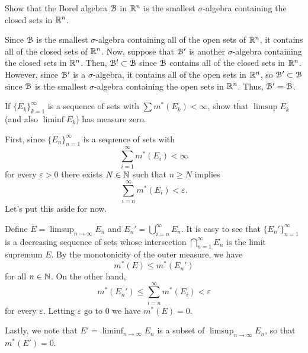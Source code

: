 \begin{problem}
  Show that the Borel algebra $\mathcal{B}$ in $\mathbb{R}^n$ is the smallest
  $\sigma$-algebra containing the closed sets in $\mathbb{R}^n$.
\end{problem}
\begin{solution}
  Since $\mathcal{B}$ is the smallest $\sigma$-algebra containing all of the open
  sets of $\mathbb{R}^n$, it contains all of the closed sets of $\mathbb{R}^n$. Now,
  suppose that $\mathcal{B}'$ is another $\sigma$-algebra containing the closed
  sets in $\mathbb{R}^n$. Then, $\mathcal{B}'\subset\mathcal{B}$ since $\mathcal{B}$ contains all
  of the closed sets in $\mathbb{R}^n$. However, since $\mathcal{B}'$ is a
  $\sigma$-algebra, it contains all of the open sets in $\mathbb{R}^n$, so
  $\mathcal{B}'\subset\mathcal{B}$ since $\mathcal{B}$ is the smallest $\sigma$-algebra
  containing the open sets in $\mathbb{R}^n$. Thus, $\mathcal{B}'=\mathcal{B}$.
\end{solution}

\begin{problem}
  If ${\{E_k\}}_{k=1}^\infty$ is a sequence of sets with
  $\sum m^*(E_k)<\infty$, show that $\limsup E_k$ (and also $\liminf E_k$)
  has measure zero.
\end{problem}
\begin{solution}
  First, since ${\{E_n\}}_{n=1}^\infty$ is a sequence of sets with
  \[
    \sum_{i=1}^\infty m^*(E_i)<\infty
  \]
  for every $\varepsilon>0$ there exists $N\in\mathbb{N}$ such that $n\geq N$
  implies
  \[
    \sum_{i=n}^\infty m^*(E_i)<\varepsilon.
  \]
  Let's put this aside for now.

  Define $E=\limsup_{n\to\infty} E_n$ and $E_n'=\bigcup_{i=n}^\infty
  E_n$. It is easy to see that ${\{E_n'\}}_{n=1}^\infty$ is a decreasing
  sequence of sets whose intersection $\bigcap_{n=1}^\infty E_n$ is the
  limit supremum $E$.  By the monotonicity of the outer measure, we have
  \[
    m^*(E)\leq m^*(E_n')
  \]
  for all $n\in\mathbb{N}$. On the other hand,
  \[
    m^*(E_n')\leq \sum_{i=n}^\infty m^*(E_i)<\varepsilon
  \]
  for every $\varepsilon$. Letting $\varepsilon$ go to $0$ we have
  $m^*(E)=0$.

  Lastly, we note that $E'=\liminf_{n\to\infty} E_n$ is a subset of
  $\limsup_{n\to\infty} E_n$, so that $m^*(E')=0$.
\end{solution}

